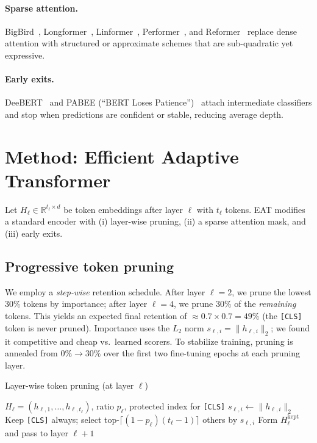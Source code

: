 \documentclass[11pt,letterpaper]{article}
\theoremstyle{plain}
\newcommand{\eat}{\textsc{EAT}}
\newcommand{\cls}{\texttt{[CLS]}}
\begin{document}
\paragraph{Sparse attention.} BigBird~\citep{zaheer2020bigbird}, Longformer~\citep{beltagy2020longformer}, Linformer~\citep{wang2020linformer}, Performer~\citep{choromanski2021performer}, and Reformer~\citep{kitaev2020reformer} replace dense attention with structured or approximate schemes that are sub-quadratic yet expressive.

\paragraph{Early exits.} DeeBERT~\citep{xin2020deebert} and PABEE (``BERT Loses Patience'')~\citep{zhou2020bert} attach intermediate classifiers and stop when predictions are confident or stable, reducing average depth.

\section{Method: Efficient Adaptive Transformer}
Let $H_\ell \in \mathbb{R}^{t_\ell \times d}$ be token embeddings after layer $\ell$ with $t_{\ell}$ tokens. \eat{} modifies a standard encoder with (i) layer-wise pruning, (ii) a sparse attention mask, and (iii) early exits.

\subsection{Progressive token pruning}
We employ a \emph{step-wise} retention schedule. After layer $\ell{=}2$, we prune the lowest $30\%$ tokens by importance; after layer $\ell{=}4$, we prune $30\%$ of the \emph{remaining} tokens. This yields an expected final retention of $\approx 0.7 \times 0.7 = 49\%$ (the \cls{} token is never pruned). Importance uses the $L_2$ norm $s_{\ell,i}=\| h_{\ell,i}\|_2$; we found it competitive and cheap vs.\ learned scorers. To stabilize training, pruning is annealed from $0\% \to 30\%$ over the first two fine-tuning epochs at each pruning layer.

\begin{algorithm}[t]
\caption{Layer-wise token pruning (at layer $\ell$)}
\label{alg:prune}
\begin{algorithmic}[1]
\Require $H_\ell = (h_{\ell,1},\dots,h_{\ell,t_\ell})$, ratio $p_\ell$, protected index for \cls{}
\State $s_{\ell,i} \leftarrow \|h_{\ell,i}\|_2$  
\State Keep \cls{} always; select top-$\lceil (1-p_\ell)(t_\ell-1) \rceil$ others by $s_{\ell,i}$
\State Form $H_{\ell}^{\text{kept}}$ and pass to layer $\ell{+}1$
\end{algorithmic}
\end{algorithm}
\end{document}
